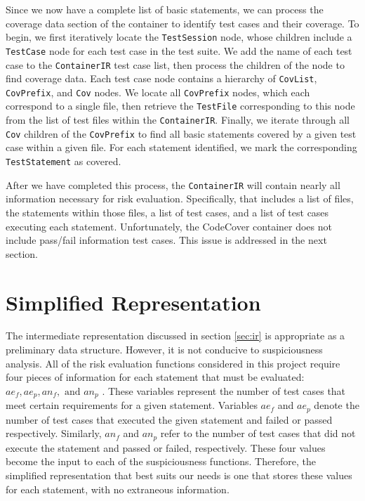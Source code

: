 Since we now have a complete list of basic statements, we can process the coverage data section
of the container to identify test cases and their coverage.  To begin, we first iteratively 
locate the \texttt{TestSession} node, whose children include a \texttt{TestCase} node for
each test case in the test suite.  We add the name of each test case to the \texttt{ContainerIR}
test case list, then process the children of the node to find coverage data.  Each test case
node contains a hierarchy of \texttt{CovList}, \texttt{CovPrefix}, and \texttt{Cov} nodes.  We 
locate all \texttt{CovPrefix} nodes, which each correspond to a single file, then retrieve the
\texttt{TestFile} corresponding to this node from the list of test files within the \texttt{ContainerIR}.
Finally, we iterate through all \texttt{Cov} children of the \texttt{CovPrefix} to find all 
basic statements covered by a given test case within a given file.  For each statement identified,
we mark the corresponding \texttt{TestStatement} as covered.

After we have completed this process, the \texttt{ContainerIR} will contain nearly all information 
necessary for risk evaluation.  Specifically, that includes a list of files, the statements within
those files, a list of test cases, and a list of test cases executing each statement.  Unfortunately,
the CodeCover container does not include pass/fail information test cases.  This issue is addressed
in the next section.

\section{Simplified Representation} \label{sec:sir}

The intermediate representation discussed in section \ref{sec:ir} is appropriate as a preliminary
data structure.  However, it is not conducive to suspiciousness analysis.  All of the risk evaluation
functions considered in this project require four pieces of information for each statement that
must be evaluated: $ae_f, ae_p, an_f, \text{ and } an_p$ \cite{theory}.  These variables represent the number
of test cases that meet certain requirements for a given statement.  Variables $ae_f$ and $ae_p$
denote the number of test cases that executed the given statement and failed or passed
respectively. Similarly, $an_f$ and $an_p$ refer to the number of test cases that did not execute
the statement and passed or failed, respectively.  These four values become the input to each of
the suspiciousness functions.  Therefore, the simplified representation that best suits our needs
is one that stores these values for each statement, with no extraneous information.

